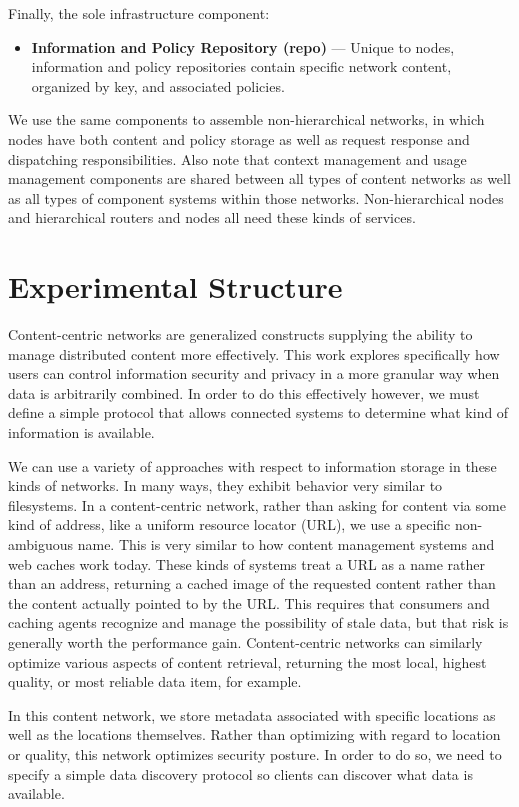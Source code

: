 Finally, the sole infrastructure component:

\begin{itemize}
\item \textbf{Information and Policy Repository (repo)} --- Unique to nodes, information and policy repositories contain specific network content, organized by key, and associated policies.
\end{itemize}

We use the same components to assemble non-hierarchical networks, in which nodes have both content and policy storage as well as request response and dispatching responsibilities.  Also note that context management and usage management components are shared between all types of content networks as well as all types of component systems within those networks.  Non-hierarchical nodes and hierarchical routers and nodes all need these kinds of services.

\section{Experimental Structure}
Content-centric networks are generalized constructs supplying the ability to manage distributed content more effectively.  This work explores specifically how users can control information security and privacy in a more granular way when data is arbitrarily combined.  In order to do this effectively however, we must define a simple protocol that allows connected systems to determine what kind of information is available.

We can use a variety of approaches with respect to information storage in these kinds of networks.  In many ways, they exhibit behavior very similar to filesystems.  In a content-centric network, rather than asking for content via some kind of address, like a uniform resource locator (URL), we use a specific non-ambiguous name.  This is very similar to how content management systems and web caches work today.  These kinds of systems treat a URL as a name rather than an address, returning a cached image of the requested content rather than the content actually pointed to by the URL.  This requires that consumers and caching agents recognize and manage the possibility of stale data, but that risk is generally worth the performance gain.  Content-centric networks can similarly optimize various aspects of content retrieval, returning the most local, highest quality, or most reliable data item, for example.

In this content network, we store metadata associated with specific locations as well as the locations themselves.  Rather than optimizing with regard to location or quality, this network optimizes security posture.  In order to do so, we need to specify a simple data discovery protocol so clients can discover what data is available.

